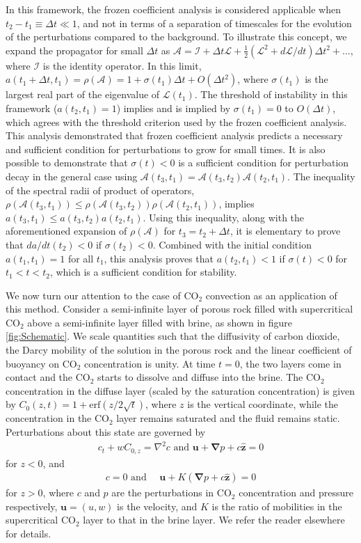 \documentclass[letterpaper,10pt,prl,twocolumn,aps,reprint,superscriptaddress]{revtex4-1}
\newcommand{\cotwo}{CO$_2$ }
\newcommand{\erf}{\text{erf}}
\newcommand{\bu}{\boldsymbol{u}}
\newcommand{\bz}{\hat{\boldsymbol{z}}}
\newcommand{\grad}{\boldsymbol{\nabla}}
\newcommand{\cL}{\boldsymbol{\mathcal{L}}}
\newcommand{\cA}{\boldsymbol{\mathcal{A}}}
\newcommand{\cI}{\boldsymbol{\mathcal{I}}}
\begin{document}
In this framework, the frozen coefficient analysis is considered applicable when $t_2 - t_1 \equiv \Delta t \ll 1$, and not in terms of a separation of timescales for the evolution of the perturbations compared to the background.
To illustrate this concept, we expand the propagator for small $\Delta t$ as $\cA = \cI + \Delta t \cL + \frac{1}{2} \left(\cL^2 + d\cL/dt \right) \Delta t^2 + \dots$, where $\cI$ is the identity operator. 
In this limit, $a(t_1 + \Delta t, t_1) = \rho(\cA) = 1 + \sigma(t_1) \Delta t + O(\Delta t^2)$, where $\sigma(t_1)$ is the largest real part of the eigenvalue of $\cL(t_1)$.
The threshold of instability in this framework ($a(t_2,t_1) = 1$) implies and is implied by $\sigma(t_1) = 0$ to $O(\Delta t)$, which agrees with the threshold criterion used by the frozen coefficient analysis.
This analysis demonstrated that frozen coefficient analysis predicts a necessary and sufficient condition for perturbations to grow for small times. It is also possible to demonstrate that $\sigma(t) < 0$ is a sufficient condition for perturbation decay in the general case using $\cA(t_3,t_1) = \cA (t_3, t_2) \cA(t_2, t_1)$. The inequality of the spectral radii of product of operators, $\rho(\cA(t_3,t_1)) \le \rho(\cA(t_3,t_2)) \rho(\cA(t_2,t_1))$, implies $a(t_3, t_1) \le a(t_3, t_2) a(t_2, t_1)$. Using this inequality, along with the aforementioned expansion of $\rho(\cA)$ for $t_3 = t_2 + \Delta t$, it is elementary to prove that $da/dt(t_2) < 0$ if $\sigma(t_2)<0$. Combined with the initial condition $a(t_1, t_1) = 1$ for all $t_1$, this analysis proves that $a(t_2, t_1)<1$ if $\sigma(t)<0$ for $t_1<t<t_2$, which is a sufficient condition for stability.

We now turn our attention to the case of \cotwo convection as an application of this method. 
Consider a semi-infinite layer of porous rock filled with supercritical \cotwo above a semi-infinite layer filled with brine, as shown in figure \ref{fig:Schematic}. 
We scale quantities such that the diffusivity of carbon dioxide, the Darcy mobility of the solution in the porous rock and the linear coefficient of buoyancy on \cotwo concentration is unity. 
At time $t=0$, the two layers come in contact and the \cotwo starts to dissolve and diffuse into the brine. 
The \cotwo concentration in the diffuse layer (scaled by the saturation concentration) is given by $C_0(z,t) = 1 + \erf( {z}/{2\sqrt{t}})$, where $z$ is the vertical coordinate, while the concentration in the \cotwo layer remains saturated and the fluid remains static. 
Perturbations about this state are governed by 
\begin{align}
 c_t + w C_{0,z} = \nabla^2 c \text{ and }
 \bu + \grad p + c\bz = 0
 \label{eqn:linone}
\end{align}
for $z<0$, and 
\begin{align}
 c = 0 \text{ and } \quad \bu + K (\grad p + c\bz) = 0
 \label{eqn:lintwo}
\end{align}
for $z>0$, where $c$ and $p$ are the perturbations in \cotwo concentration and pressure respectively, $\bu = (u,w)$ is the velocity, and $K$ is the ratio of mobilities in the supercritical \cotwo layer to that in the brine layer. 
We refer the reader elsewhere\cite{SlimRama10} for details. 
\end{document}
